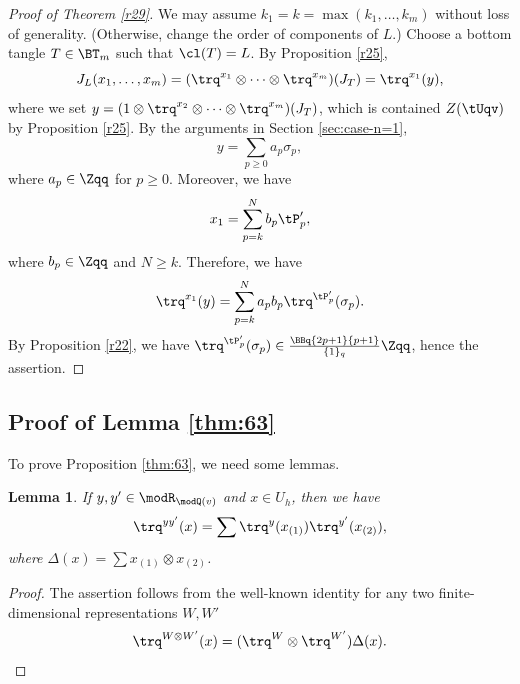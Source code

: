 \documentclass{amsart}
\numberwithin{equation}{section}
\numberwithin{figure}{section}
\theoremstyle{plain}
\newtheorem{lemma}[theorem]{Lemma}
\theoremstyle{definition}
\theoremstyle{remark}
\begin{document}
\begin{proof}[Proof of Theorem \ref{r29}]
  We may assume $k_1=k=\max(k_1,\ldots,k_m)$ without loss of generality.
  (Otherwise, change the order of components of $L$.)  Choose a bottom
  tangle $T\in \BT_m$ such that $\cl(T)=L$.  By Proposition \ref{r25},
  \begin{equation*}
    J_L(x_1,\ldots,x_m)
    =(\trq^{x_1}\otimes \cdots\otimes \trq^{x_m})(J_T)
    =\trq^{x_1}(y),
  \end{equation*}
  where we set $y=(1\otimes \trq^{x_2}\otimes \cdots\otimes \trq^{x_m})(J_T)$, which is
  contained $Z(\tUqv)$ by Proposition \ref{r25}.  By the arguments in
  Section \ref{sec:case-n=1},
  \begin{equation*}
    y=\sum_{p\ge 0} a_p\sigma _p,
  \end{equation*}
  where $a_p\in \Zqq$ for $p\ge 0$.  Moreover, we have
  \begin{equation*}
    x_1=\sum_{p=k}^N b_p\tP'_p,
  \end{equation*}
  where $b_p\in \Zqq$ and $N\ge k$.  Therefore, we have
  \begin{equation*}
    \trq^{x_1}(y)
    =\sum_{p=k}^N a_pb_p\trq^{\tP'_p}(\sigma _p).
  \end{equation*}
  By Proposition \ref{r22}, we have
  $\trq^{\tP'_p}(\sigma _p)\in \frac{\BBq{2p+1}{p+1}}{\{1\}_q}\Zqq$, hence
  the assertion.
\end{proof}

\subsection{Proof of Lemma \ref{thm:63}}
\label{sec:integr-quant-trac}

To prove Proposition \ref{thm:63}, we need some lemmas.

\begin{lemma}
  \label{lem:2}
  If $y,y'\in \modR _{\modQ (v)}$ and $x\in U_h$, then we have
  \begin{equation*}
    \trq^{yy'}(x) = \sum \trq^{y}(x_{(1)})\trq^{y'}(x_{(2)}),
  \end{equation*}
  where $\Delta (x)=\sum x_{(1)}\otimes x_{(2)}$.
\end{lemma}

\begin{proof}
  The assertion follows from the well-known identity for any two
  finite-dimensional representations $W,W'$
  \begin{equation*}
    \trq^{W\otimes W'}(x)=(\trq^W\otimes \trq^{W'})\Delta (x).
  \end{equation*}
\end{proof}
\end{document}
